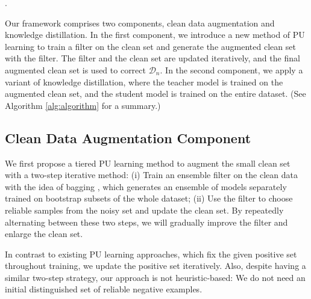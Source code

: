 \documentclass[conference]{IEEEtran}
\begin{document}
\begin{algorithm}[H]
\begin{algorithmic}[1]
  \ENDFOR
\ENDFOR
{}
\ENDFOR
{}.
\end{algorithmic}
\end{algorithm}




Our framework comprises two components, clean data augmentation and knowledge distillation.
In the first component, we introduce a new method of PU learning to train a filter on the clean set and generate the augmented clean set with the filter.
The filter and the clean set are updated iteratively, and the final augmented clean set is used to correct $\mathcal{D}_n$.
In the second component, we apply a variant of knowledge distillation, where the teacher model is trained on the augmented clean set, and the student model is trained on the entire dataset. (See Algorithm \ref{alg:algorithm} for a summary.)






\subsection{Clean Data Augmentation Component}
\label{clean data augmentation}



We first propose a tiered PU learning method to augment the small clean set with a two-step iterative method:
(i) Train an ensemble filter on the clean data with the idea of bagging \cite{Breiman1996}, which generates an ensemble of models separately trained on bootstrap subsets of the whole dataset;
(ii) Use the filter to choose reliable samples from the noisy set and update the clean set.
By repeatedly alternating between these two steps, we will gradually improve the filter and enlarge the clean set.

In contrast to existing PU learning approaches, which fix the given positive set throughout training, we update the positive set iteratively.
Also, despite having a similar two-step strategy, our approach is not heuristic-based: We do not need an initial distinguished set of reliable negative examples.
\end{document}
